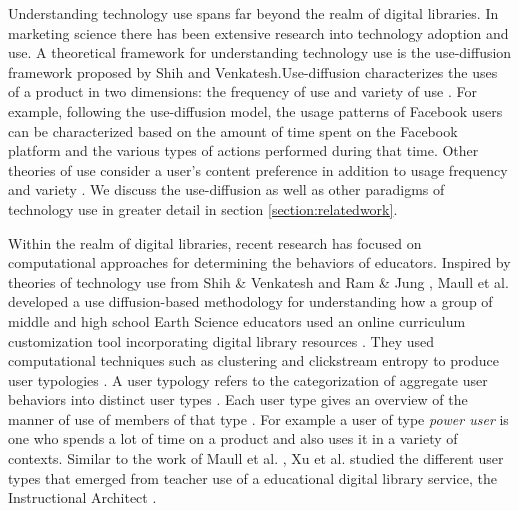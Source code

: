 \documentclass{acm_proc_article-sp}
\begin{document}
Understanding technology use spans far beyond the realm of digital libraries. In marketing science there has been extensive research into technology adoption and use. A  theoretical framework for understanding technology use is the use-diffusion framework proposed by Shih and Venkatesh.Use-diffusion characterizes the uses of a product in two dimensions: the frequency of use and variety of use \cite{shih2004beyond}.  For example, following the use-diffusion model, the usage patterns of Facebook users can be characterized based on the amount of time spent on the Facebook platform and the various types of actions performed during that time. Other theories of use consider a user's content preference in addition to usage frequency and variety \cite{brandtzaeg2010towards}. We discuss the use-diffusion as well as other paradigms of technology use in greater detail in section \ref{section:relatedwork}. 

Within the realm of digital libraries, recent research has focused on computational approaches for determining the behaviors of educators. Inspired by theories of technology use from Shih \& Venkatesh and Ram \& Jung \cite{shih2004beyond, ram1990conceptualization}, Maull et al. \cite{maullunderstanding} developed a use diffusion-based methodology for understanding how a group of middle and high school Earth Science educators used an online curriculum customization tool incorporating digital library resources \cite{maullunderstanding}. They used computational techniques such as clustering and clickstream entropy to produce user typologies \cite{maullunderstanding}. A user typology refers to the categorization of aggregate user behaviors into distinct user types \cite{brandtzaeg2010towards}. Each user type gives an overview of the manner of use of members of that type \cite{brandtzaeg2010towards}. For example a user of type \textit{power user} is one who spends a lot of time on a product and also uses it in a variety of contexts. Similar to the work of Maull et al. \cite{maullunderstanding}, Xu et al. studied the different  user types that emerged from teacher use of a educational digital library service, the Instructional Architect \cite{xu}. 
\end{document}
